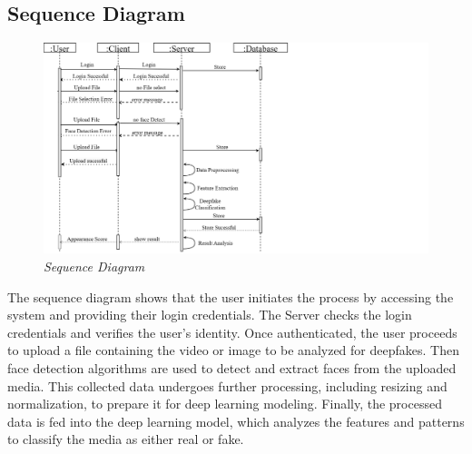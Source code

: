 \subsection{Sequence Diagram}

\begin{figure}[h]
    \centering
    \includegraphics[width=1.6\textwidth,height=\textheight,keepaspectratio]{img/sequencediagram.drawio.png}
    \caption{\textit{Sequence Diagram}}
\end{figure}

\justify
The sequence diagram shows that the user initiates the process by accessing the system and providing their login credentials. The Server checks the login credentials and verifies the user's identity. Once authenticated, the user proceeds to upload a file containing the video or image to be analyzed for deepfakes. Then face detection algorithms are used to detect and extract faces from the uploaded media. This collected data undergoes further processing, including resizing and normalization, to prepare it for deep learning modeling. Finally, the processed data is fed into the deep learning model, which analyzes the features and patterns to classify the media as either real or fake.
